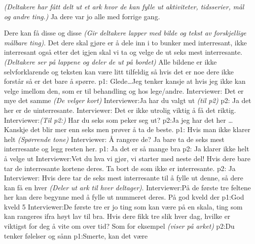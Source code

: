 \documentclass[11pt, norsk, a4paper]{article}
\begin{document}
\textcolor{myGrey}{\textit{(Deltakere har fått delt ut et ark hvor de kan fylle ut aktiviteter, tidsserier, mål og andre ting.)}} Ja dere var jo alle med forrige gang.

Dere kan få disse og disse \textcolor{myGrey}{\textit{(Gir deltakere lapper med bilde og tekst av forskjellige målbare ting)}}. Det dere skal gjøre er å dele inn i to bunker med interresant, ikke interresant også etter det igjen skal vi ta og velge de ut seks mest interresante. 
\textcolor{myGrey}{\textit{(Deltakere ser på lappene og deler de ut på bordet)}} Alle bildene er ikke selvforklarende og teksten kan være litt tilfeldig så hvis det er noe dere ikke forstår så er det bare å spørre. 
\textcolor{myGreen} {p1:} Glede\dots Jeg tenker kansje at hvis jeg ikke kan velge imellom den, som er til behandling og hos lege/andre.
\textcolor{myBlue} {Interviewer:} Det er mye det samme
\textcolor{myGrey}{\textit{(De velger kort)}}
\textcolor{myBlue} {Interviewer:}Ja har du valgt ut \textcolor{myGrey}{\textit{(til p2)}}
\textcolor{myYellow} {p2:} Ja det her er de uinterresante.
\textcolor{myBlue} {Interviewer:} Det er ikke utrolig viktig å få det riktig.
\textcolor{myBlue} {Interviewer:}\textcolor{myGrey}{\textit{(Til p2:)}} Har du seks som peker seg ut?
\textcolor{myYellow} {p2:}Ja jeg har det her \dots Kanskje det blir mer enn seks men prøver å ta de beste.
\textcolor{myGreen} {p1:} Hvis man ikke klarer helt \textcolor{myGrey}{\textit{(Spørrende tone)}}
\textcolor{myBlue} {Interviewer:} Å rangere de? Ja bare ta de seks mest interresante og legg resten her.
\textcolor{myGreen} {p1:} Ja det er så mange bra
\textcolor{myYellow} {p2:} Ja klarer ikke helt å velge ut
\textcolor{myBlue} {Interviewer:}Vet du hva vi gjør, vi starter med neste del! Hvis dere bare tar de interresante kortene deres. Ta bort de som ikke er interresante.
\textcolor{myYellow} {p2:} Ja 
\textcolor{myBlue} {Interviewer:} Hvis dere tar de seks mest interresante til å fylle ut denne, så dere kan få en hver \textcolor{myGrey}{\textit{(Deler ut ark til hver deltager)}}.
\textcolor{myBlue} {Interviewer:}På de første tre feltene her kan dere begynne med å fylle ut nummeret deres. På god kveld der
\textcolor{myGreen} {p1:}God kveld 5
\textcolor{myBlue} {Interviewer:}De første tre er jo ting som kan være på en skala, ting som kan rangeres ifra høyt lav til bra. Hvis dere fikk tre slik hver dag, hvilke er viktigst for deg å vite om over tid? Som for eksempel \textcolor{myGrey}{\textit{(viser på arket)}}
\textcolor{myYellow} {p2:}Du tenker følelser og sånn
\textcolor{myGreen} {p1:}Smerte, kan det være
\end{document}
